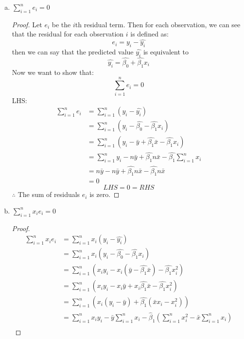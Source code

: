 \documentclass[12pt]{article}
\begin{document}
\begin{enumerate}[1.]
    \begin{enumerate}[(a)]   
        \item $\sum_{i=1}^{n} e_i = 0$
        \begin{proof}
            Let $e_i$ be the $i$th residual term. Then for each observation, we can see that
            the residual for each observation $i$ is defined as: 
            \[e_i = y_i - \hat{y_i}\]
            then we can say that the predicted value $\hat{y_i}$ is equivalent to
            \[\hat{y_i} = \hat{\beta_0} + \hat{\beta_1} x_i \]
            Now we want to show that:
            \[\sum_{i=1}^{n} e_i = 0\]
            LHS$\colon$
            \begin{align*}
                \sum_{i=1}^{n} e_i &= \sum_{i=1}^{n} (y_i - \hat{y_i}) \\
                &= \sum_{i=1}^{n} (y_i - \hat{\beta_0} - \hat{\beta_1} x_i) \\
                &= \sum_{i=1}^{n}(y_i - \bar{y} + \hat{\beta_1}\bar{x} - \hat{\beta_1} x_i) \\
                &= \sum_{i=1}^{n}y_i - n\bar{y} + \hat{\beta_1}n\bar{x} - \hat{\beta_1} \sum_{i=1}^{n}x_i \\
                &= n\bar{y} - n\bar{y} + \hat{\beta_1}n\bar{x} - \hat{\beta_1}n\bar{x} \\ 
                &= 0
            \end{align*}
            \[LHS = 0 = RHS\]
            $\therefore$ The sum of residuals $e_i$ is zero.
        \end{proof}
        \item $\sum_{i=1}^{n} x_i e_i = 0$
            \begin{proof}
                \begin{align*}
                    \sum_{i=1}^{n} x_i e_i &= \sum_{i=1}^{n} x_i (y_i - \hat{y_i}) \\
                    &= \sum_{i=1}^{n} x_i (y_i - \hat{\beta_0} - \hat{\beta_1} x_i) \\
                    &= \sum_{i=1}^{n} (x_i y_i - x_i (\bar{y} - \hat{\beta_1}\bar{x}) - \hat{\beta_1} x_i^2) \\
                    &= \sum_{i=1}^{n} (x_i y_i - x_i\bar{y} + x_i\hat{\beta_1}\bar{x} - \hat{\beta_1} x_i^2) \\
                    &= \sum_{i=1}^{n} (x_i(y_i - \bar{y}) + \hat{\beta_1}(\bar{x}x_i - x_i^2)) \\
                    &= \sum_{i=1}^n x_i y_i - \bar{y} \sum_{i=1}^n x_i - \hat{\beta}_1 \left( \sum_{i=1}^n x_i^2 - \bar{x} \sum_{i=1}^n x_i \right) \\

\end{align*}
\end{proof}
\end{enumerate}
\end{enumerate}
\end{document}
